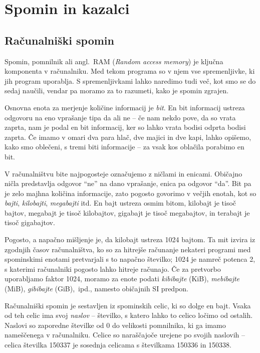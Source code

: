 \documentclass{book}
\begin{document}
\chapter{Spomin in kazalci}

\section{Računalniški spomin}

Spomin, pomnilnik ali angl.~RAM (\textit{Random access memory})
je ključna komponenta v računalniku. Med tekom programa so v njem vse
spremenljivke, ki jih program uporablja. S spremenljivkami lahko naredimo tudi
več, kot smo se do sedaj naučili, vendar pa moramo za to razumeti, kako je
spomin zgrajen.

Osnovna enota za merjenje količine informacij je \emph{bit}.
En bit informacij ustreza odgovoru na eno vprašanje tipa da ali ne
-- če nam nekdo pove, da so vrata zaprta, nam je podal en bit informacij,
ker so lahko vrata bodisi odprta bodisi zaprta.
Če imamo v omari dva para hlač, dve majici in dve kapi, lahko opišemo,
kako smo oblečeni, s tremi biti informacije -- za vsak kos oblačila porabimo
en bit.

V računalništvu bite najpogosteje označujemo z ničlami in enicami.
Običajno ničla predstavlja odgovor ``ne'' na dano vprašanje,
enica pa odgovor ``da''. Bit pa je zelo majhna količina informacije, zato
pogosto govorimo v večjih enotah, kot so \emph{bajti}, \emph{kilobajti},
\emph{megabajti} itd. En bajt ustreza osmim bitom, kilobajt je tisoč bajtov,
megabajt je tisoč kilobajtov, gigabajt je tisoč megabajtov, in terabajt je
tisoč gigabajtov.

\begin{errors}
  Pogosto, a napačno mišljenje je, da kilobajt ustreza 1024 bajtom.
  Ta mit izvira iz zgodnjih časov računalništva, ko so za hitrejše
  računanje nekateri programi med spominskimi enotami pretvarjali
  s to napačno številko; 1024 je namreč potenca 2, s katerimi računalniki
  pogosto lahko hitreje računajo.
  Če za pretvorbo uporabljamo faktor 1024, moramo za enote podati
  \emph{kibibajte} (KiB), \emph{mebibajte} (MiB), \emph{gibibajte} (GiB),~ipd.,
  namesto običajnih SI predpon.
\end{errors}

Računalniški spomin je sestavljen iz spominskih celic, ki so dolge en bajt.
Vsaka od teh celic ima svoj \emph{naslov} -- številko, s katero lahko to
celico ločimo od ostalih. Naslovi so zaporedne številke od 0 do velikosti
pomnilnika, ki ga imamo nameščenega v računalniku.
Celice so naraščajoče urejene po svojih naslovih -- celica številka 150337 je
sosednja celicama s številkama 150336 in 150338.
\end{document}
